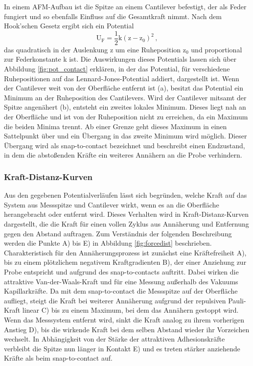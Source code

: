           \FloatBarrier      
          In einem AFM-Aufbau ist die Spitze an einem Cantilever befestigt, der als Feder fungiert und so ebenfalls Einfluss auf die Gesamtkraft nimmt. Nach dem Hook'schen Gesetz ergibt sich ein Potential 
          \begin{equation*}
            \text{U}_{\text{F}} = \frac{1}{2} \text{k} \left(\text{z} - \text{z}_0\right)^2 \, ,
          \end{equation*}
          das quadratisch in der Auslenkung z um eine Ruheposition z$_0$ und proportional zur Federkonstante k ist. 
          Die Auswirkungen dieses Potentials lassen sich über Abbildung \ref{fig:pot_contact} erklären, in der 
          das Potential, für verschiedene Ruhepositionen auf das Lennard-Jones-Potential addiert, dargestellt ist. Wenn der Cantilever weit von der Oberfläche entfernt ist (a), besitzt das Potential ein 
          Minimum an der Ruheposition des Cantilevers. Wird der Cantilever mitsamt der Spitze angenähert (b), entsteht ein zweites lokales Minimum. Dieses liegt nah an der Oberfläche und ist von der Ruheposition
          nicht zu erreichen, da ein Maximum die beiden Minima trennt. Ab einer Grenze geht dieses Maximum in einen Sattelpunkt über und ein Übergang in das zweite Minimum wird möglich. Dieser Übergang wird als
          snap-to-contact bezeichnet und beschreibt einen Endzustand, in dem die abstoßenden Kräfte ein weiteres Annähern an die Probe verhindern. 




        \newpage
        \subsubsection{Kraft-Distanz-Kurven}

          Aus den gegebenen Potentialverläufen lässt sich begründen, welche Kraft auf das System aus Messspitze und Cantilever wirkt, wenn es an die Oberfläche herangebracht oder entfernt wird. Dieses Verhalten
          wird in Kraft-Distanz-Kurven dargestellt, die die Kraft für einen vollen Zyklus aus Annäherung und Entfernung gegen den Abstand auftragen. Zum Verständnis der folgenden Beschreibung werden die Punkte A) bis E) in Abbildung \ref{fig:forcedist} beschrieben. Charakteristisch für den Annäherungsprozess ist zunächst
          eine Kräftefreiheit A), bis zu einem plötzlichem negativem Kraftgradienten B), der einer Anziehung zur Probe entspricht und aufgrund des snap-to-contacts auftritt. Dabei wirken die attraktive Van-der-Waals-Kraft und für eine Messung außerhalb des Vakuums Kapillarkräfte. Da mit dem snap-to-contact die Messspitze auf 
          der Oberfläche aufliegt, steigt die Kraft bei weiterer Annäherung aufgrund der repulsiven Pauli-Kraft linear C) bis zu einem Maximum, bei dem das Annähern gestoppt wird. Wenn das Messsystem entfernt wird, sinkt die Kraft analog zu ihrem 
          vorherigen Anstieg D), bis die wirkende Kraft bei dem selben Abstand wieder ihr Vorzeichen wechselt. In Abhängigkeit von der Stärke der attraktiven Adhesionskräfte verbleibt die Spitze nun länger in Kontakt E) und es treten stärker anziehende Kräfte als beim snap-to-contact auf. 
          
